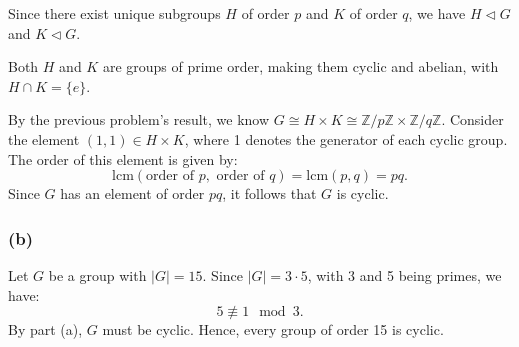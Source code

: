 \documentclass[12pt]{article}
\begin{document}
Since there exist unique subgroups \( H \) of order \( p \) and \( K \) of order \( q \), we have \( H \triangleleft G \) and \( K \triangleleft G \). 

Both \( H \) and \( K \) are groups of prime order, making them cyclic and abelian, with \( H \cap K = \{e\} \). 

By the previous problem's result, we know \( G \cong H \times K \cong \mathbb{Z}/p\mathbb{Z} \times \mathbb{Z}/q\mathbb{Z} \). Consider the element \( (1, 1) \in H \times K \), where 1 denotes the generator of each cyclic group. The order of this element is given by:
\[
\text{lcm}(\text{order of } p, \text{ order of } q) = \text{lcm}(p, q) = pq.
\]
Since \( G \) has an element of order \( pq \), it follows that \( G \) is cyclic.

\subsubsection*{(b)}
Let \( G \) be a group with \( |G| = 15 \). Since \( |G| = 3 \cdot 5 \), with 3 and 5 being primes, we have:
\[
5 \not\equiv 1 \mod 3.
\]
By part (a), \( G \) must be cyclic. Hence, every group of order 15 is cyclic.
\end{document}
